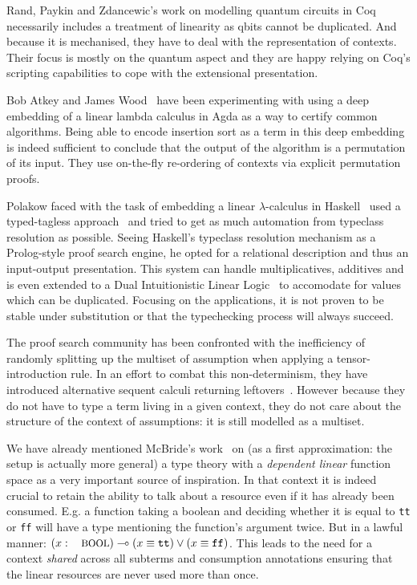 Rand, Paykin and Zdancewic's work on modelling quantum circuits in
Coq~\cite{rand17qwire} necessarily includes a treatment of linearity
as qbits cannot be duplicated. And because it is mechanised, they have
to deal with the representation of contexts. Their focus is mostly on
the quantum aspect and they are happy relying on Coq's scripting
capabilities to cope with the extensional presentation.

Bob Atkey and James Wood~\cite{bob:sortingtypes} have been experimenting
with using a deep embedding of a linear lambda calculus in Agda as a way
to certify common algorithms. Being able to encode insertion sort as a
term in this deep embedding is indeed sufficient to conclude that the
output of the algorithm is a permutation of its input. They use on-the-fly
re-ordering of contexts via explicit permutation proofs.

Polakow faced with the task of embedding a linear \ensuremath{\lambda}-calculus in
Haskell~\cite{polakow2016embedding} used a typed-tagless
approach~\cite{kiselyov2012typed} and tried to get as much automation
from typeclass resolution as possible. Seeing Haskell's typeclass
resolution mechanism as a Prolog-style proof search engine, he opted
for a relational description and thus an input-output presentation.
This system can handle multiplicatives, additives and is even extended
to a Dual Intuitionistic Linear Logic~\cite{barber1996dual} to accomodate
for values which can be duplicated. Focusing on the applications, it is
not proven to be stable under substitution or that the typechecking process
will always succeed.

The proof search community has been confronted with the inefficiency
of randomly splitting up the multiset of assumption when applying a
tensor-introduction rule. In an effort to combat this non-determinism,
they have introduced alternative sequent calculi returning
leftovers~\cite{cervesato1996efficient, winiko1994deterministic}.
However because they do not have to type a term living in a given
context, they do not care about the structure of the context of
assumptions: it is still modelled as a multiset.

We have already mentioned McBride's work~\cite{mcbride2016got}
on (as a first approximation: the setup is actually more general)
a type theory with a \emph{dependent linear} function space as a
very important source of inspiration. In that context it is indeed
crucial to retain the ability to talk about a resource even if it
has already been consumed. E.g. a function taking a boolean and
deciding whether it is equal to \texttt{tt} or \texttt{ff} will
have a type mentioning the function's argument twice. But in a
lawful manner: $(x : \DefinedType{Bool}) \ensuremath{\multimap} (x \ensuremath{\equiv} \texttt{tt}) \ensuremath{\vee} (x \ensuremath{\equiv} \texttt{ff})$.
This leads to the need for a context \emph{shared} across all
subterms and consumption annotations ensuring that the linear
resources are never used more than once.

